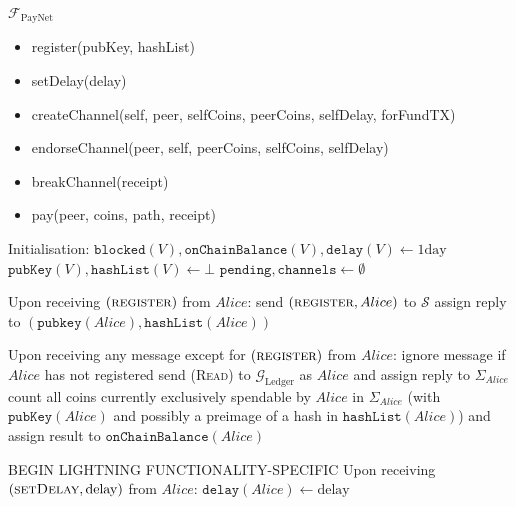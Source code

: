 \begin{functionality}{$\mathcal{F}_{\mathrm{PayNet}}$}
  \label{alg:payfunc}
    \begin{itemize}
      \item register(pubKey, hashList)
      \item setDelay(delay)
      \item createChannel(self, peer, selfCoins, peerCoins, selfDelay, forFundTX)
      \item endorseChannel(peer, self, peerCoins, selfCoins, selfDelay)
      \item breakChannel(receipt)
      \item pay(peer, coins, path, receipt)
    \end{itemize}

  \begin{algorithmic}[1]
    \State Initialisation:
      \Indent
        \State $\mathtt{blocked}\left(V\right),
        \mathtt{onChainBalance}\left(V\right), \mathtt{delay}\left(V\right)
        \gets 1\mathrm{day}$ 
        \State $\mathtt{pubKey}\left(V\right), \mathtt{hashList}\left(V\right)
        \gets \bot$
      \EndFor
      \State $\mathtt{pending}, \mathtt{channels} \gets \emptyset$
      \EndIndent
    \State

    \State Upon receiving $\left(\textsc{register}\right)$ from $Alice$:
    \Indent
      \State send $\left(\textsc{register}, Alice\right)$ to $\mathcal{S}$
      \State assign reply to $\left(\mathtt{pubkey}\left(Alice\right),
      \mathtt{hashList}\left(Alice\right)\right)$
    \EndIndent
    \State

    \State Upon receiving any message except for
    $\left(\textsc{register}\right)$ from $Alice$:
    \Indent
      \State ignore message if $Alice$ has not registered
      \State send (\textsc{Read}) to $\mathcal{G}_{\mathrm{Ledger}}$ as $Alice$
      and assign reply to $\Sigma_{Alice}$
      \State count all coins currently exclusively spendable by $Alice$ in
      $\Sigma_{Alice}$ (with $\mathtt{pubKey}\left(Alice\right)$ and possibly a
      preimage of a hash in $\mathtt{hashList}\left(Alice\right)$) and assign
      result to $\mathtt{onChainBalance}\left(Alice\right)$ 
    \EndIndent
    \State

    \State BEGIN LIGHTNING FUNCTIONALITY-SPECIFIC
    \State Upon receiving $\left(\textsc{setDelay}, \mathrm{delay}\right)$
    from $Alice$:
    \Indent
      \State $\mathtt{delay}\left(Alice\right) \gets \mathrm{delay}$
    \EndIndent
    \State


\end{algorithmic}
\end{functionality}
